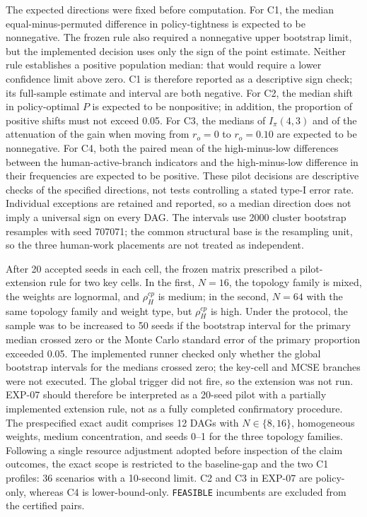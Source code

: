 The expected directions were fixed before computation. For C1, the median
equal-minus-permuted difference in policy-tightness is expected to be
nonnegative. The frozen rule also required a nonnegative upper bootstrap
limit, but the implemented decision uses only the sign of the point estimate.
Neither rule establishes a positive population median: that would require a
lower confidence limit above zero. C1 is therefore reported as a descriptive
sign check; its full-sample estimate and interval are both negative. For C2, the
median shift in policy-optimal $P$ is expected to be nonpositive; in addition,
the proportion of positive shifts must not exceed 0.05. For C3, the medians of
$I_\pi(4,3)$ and of the attenuation of the gain when moving from $r_o=0$ to
$r_o=0.10$ are expected to be nonnegative. For C4, both the paired mean of the
high-minus-low differences between the human-active-branch indicators and the
high-minus-low difference in their frequencies are expected to be positive.
These pilot decisions are descriptive checks of the specified directions,
not tests controlling a stated type-I error rate. Individual exceptions are
retained and reported, so a median direction does not imply a universal sign
on every DAG\@. The intervals
use 2000 cluster bootstrap resamples with seed 707071; the common structural
base is the resampling unit, so the three human-work placements are not treated
as independent.

After 20 accepted seeds in each cell, the frozen matrix prescribed a
pilot-extension rule for two key cells. In the first, $N=16$, the topology
family is mixed, the weights are lognormal, and $\rho_H^{cp}$ is medium; in the
second, $N=64$ with the same topology family and weight type, but
$\rho_H^{cp}$ is high. Under the protocol, the sample was to be increased to 50
seeds if the bootstrap interval for the primary median crossed zero or the
Monte Carlo standard error of the primary proportion exceeded 0.05. The
implemented runner checked only whether the global bootstrap intervals for the
medians crossed zero; the key-cell and MCSE branches were not executed. The
global trigger did not fire, so the extension was not run. EXP-07 should
therefore be interpreted as a 20-seed pilot with a partially implemented
extension rule, not as a fully completed confirmatory procedure. The
prespecified exact audit comprises 12 DAGs with $N\in\{8,16\}$, homogeneous
weights, medium concentration, and seeds 0--1 for the three topology families.
Following a single resource adjustment adopted before inspection of the claim
outcomes, the exact scope is restricted to the baseline-gap and the two C1
profiles: 36 scenarios with a 10-second limit. C2 and C3 in EXP-07 are
policy-only, whereas C4 is lower-bound-only. \texttt{FEASIBLE} incumbents are
excluded from the certified pairs.
